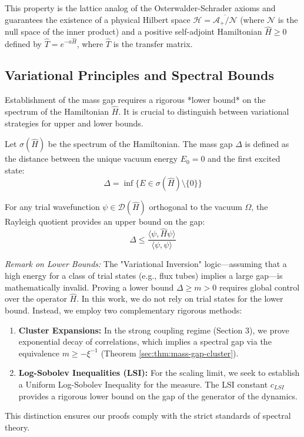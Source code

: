 This property is the lattice analog of the Osterwalder-Schrader axioms and guarantees the existence of a physical Hilbert space $\mathcal{H} = \overline{\mathcal{A}_+ / \mathcal{N}}$ (where $\mathcal{N}$ is the null space of the inner product) and a positive self-adjoint Hamiltonian $\hat{H} \ge 0$ defined by $\hat{T} = e^{-a \hat{H}}$, where $\hat{T}$ is the transfer matrix.

\subsection{Variational Principles and Spectral Bounds}
\label{sec:variational_principles}

Establishment of the mass gap requires a rigorous *lower bound* on the spectrum of the Hamiltonian $\hat{H}$. It is crucial to distinguish between variational strategies for upper and lower bounds.

\begin{definition}
Let $\sigma(\hat{H})$ be the spectrum of the Hamiltonian. The mass gap $\Delta$ is defined as the distance between the unique vacuum energy $E_0 = 0$ and the first excited state:
\begin{equation}
\Delta = \inf \{ E \in \sigma(\hat{H}) \setminus \{0\} \}
\end{equation}
\end{definition}

\begin{proposition}
For any trial wavefunction $\psi \in \mathcal{D}(\hat{H})$ orthogonal to the vacuum $\Omega$, the Rayleigh quotient provides an upper bound on the gap:
\begin{equation}
\Delta \le \frac{\langle \psi, \hat{H} \psi \rangle}{\langle \psi, \psi \rangle}
\end{equation}
\end{proposition}

\textit{Remark on Lower Bounds:} The "Variational Inversion" logic—assuming that a high energy for a class of trial states (e.g., flux tubes) implies a large gap—is mathematically invalid. Proving a lower bound $\Delta \ge m > 0$ requires global control over the operator $\hat{H}$. In this work, we do not rely on trial states for the lower bound. Instead, we employ two complementary rigorous methods:
\begin{enumerate}
    \item \textbf{Cluster Expansions:} In the strong coupling regime (Section 3), we prove exponential decay of correlations, which implies a spectral gap via the equivalence $m \ge -\xi^{-1}$ (Theorem \ref{sec:thm:mass-gap-cluster}).
    \item \textbf{Log-Sobolev Inequalities (LSI):} For the scaling limit, we seek to establish a Uniform Log-Sobolev Inequality for the measure. The LSI constant $c_{LSI}$ provides a rigorous lower bound on the gap of the generator of the dynamics.
\end{enumerate}
This distinction ensures our proofs comply with the strict standards of spectral theory.

